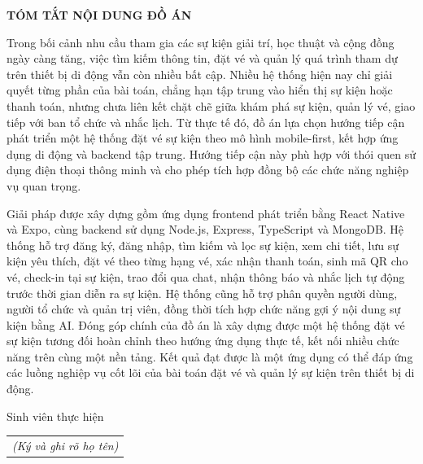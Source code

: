 \documentclass[../DoAn.tex]{subfiles}
\begin{document}
\begin{center}
    \Large{\textbf{TÓM TẮT NỘI DUNG ĐỒ ÁN}}\\
\end{center}
\vspace{1cm}
Trong bối cảnh nhu cầu tham gia các sự kiện giải trí, học thuật và cộng đồng ngày càng tăng, việc tìm kiếm thông tin, đặt vé và quản lý quá trình tham dự trên thiết bị di động vẫn còn nhiều bất cập. Nhiều hệ thống hiện nay chỉ giải quyết từng phần của bài toán, chẳng hạn tập trung vào hiển thị sự kiện hoặc thanh toán, nhưng chưa liên kết chặt chẽ giữa khám phá sự kiện, quản lý vé, giao tiếp với ban tổ chức và nhắc lịch. Từ thực tế đó, đồ án lựa chọn hướng tiếp cận phát triển một hệ thống đặt vé sự kiện theo mô hình mobile-first, kết hợp ứng dụng di động và backend tập trung. Hướng tiếp cận này phù hợp với thói quen sử dụng điện thoại thông minh và cho phép tích hợp đồng bộ các chức năng nghiệp vụ quan trọng.

Giải pháp được xây dựng gồm ứng dụng frontend phát triển bằng React Native và Expo, cùng backend sử dụng Node.js, Express, TypeScript và MongoDB. Hệ thống hỗ trợ đăng ký, đăng nhập, tìm kiếm và lọc sự kiện, xem chi tiết, lưu sự kiện yêu thích, đặt vé theo từng hạng vé, xác nhận thanh toán, sinh mã QR cho vé, check-in tại sự kiện, trao đổi qua chat, nhận thông báo và nhắc lịch tự động trước thời gian diễn ra sự kiện. Hệ thống cũng hỗ trợ phân quyền người dùng, người tổ chức và quản trị viên, đồng thời tích hợp chức năng gợi ý nội dung sự kiện bằng AI. Đóng góp chính của đồ án là xây dựng được một hệ thống đặt vé sự kiện tương đối hoàn chỉnh theo hướng ứng dụng thực tế, kết nối nhiều chức năng trên cùng một nền tảng. Kết quả đạt được là một ứng dụng có thể đáp ứng các luồng nghiệp vụ cốt lõi của bài toán đặt vé và quản lý sự kiện trên thiết bị di động.
\begin{flushright}
Sinh viên thực hiện\\
\begin{tabular}{@{}c@{}}
\textit{(Ký và ghi rõ họ tên)}
\end{tabular}
\end{flushright}
\end{document}
